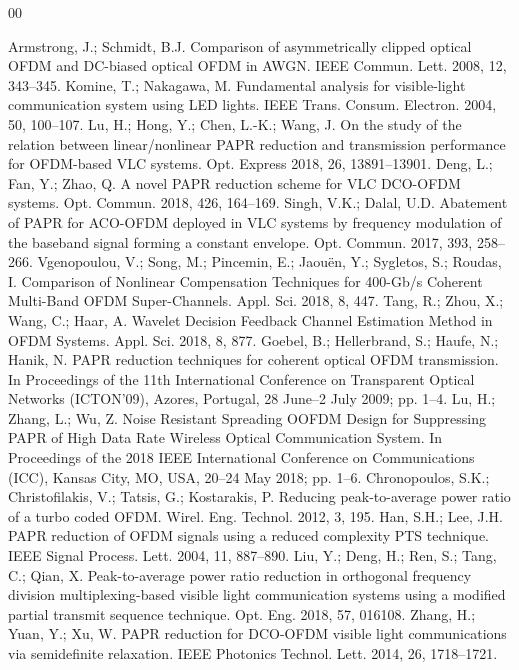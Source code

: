 \documentclass[conference]{IEEEtran}
\begin{document}
\begin{thebibliography}{00}

 Armstrong, J.; Schmidt, B.J. Comparison of asymmetrically clipped optical OFDM and DC-biased optical OFDM in AWGN. IEEE Commun. Lett. 2008, 12, 343--345.
 Komine, T.; Nakagawa, M. Fundamental analysis for visible-light communication system using LED lights. IEEE Trans. Consum. Electron. 2004, 50, 100--107.
 Lu, H.; Hong, Y.; Chen, L.-K.; Wang, J. On the study of the relation between linear/nonlinear PAPR reduction and transmission performance for OFDM-based VLC systems. Opt. Express 2018, 26, 13891--13901.
 Deng, L.; Fan, Y.; Zhao, Q. A novel PAPR reduction scheme for VLC DCO-OFDM systems. Opt. Commun. 2018, 426, 164--169.
 Singh, V.K.; Dalal, U.D. Abatement of PAPR for ACO-OFDM deployed in VLC systems by frequency modulation of the baseband signal forming a constant envelope. Opt. Commun. 2017, 393, 258--266.
 Vgenopoulou, V.; Song, M.; Pincemin, E.; Jaouën, Y.; Sygletos, S.; Roudas, I. Comparison of Nonlinear Compensation Techniques for 400-Gb/s Coherent Multi-Band OFDM Super-Channels. Appl. Sci. 2018, 8, 447.
 Tang, R.; Zhou, X.; Wang, C.; Haar, A. Wavelet Decision Feedback Channel Estimation Method in OFDM Systems. Appl. Sci. 2018, 8, 877.
 Goebel, B.; Hellerbrand, S.; Haufe, N.; Hanik, N. PAPR reduction techniques for coherent optical OFDM transmission. In Proceedings of the 11th International Conference on Transparent Optical Networks (ICTON'09), Azores, Portugal, 28 June--2 July 2009; pp. 1--4.
 Lu, H.; Zhang, L.; Wu, Z. Noise Resistant Spreading OOFDM Design for Suppressing PAPR of High Data Rate Wireless Optical Communication System. In Proceedings of the 2018 IEEE International Conference on Communications (ICC), Kansas City, MO, USA, 20--24 May 2018; pp. 1--6.
 Chronopoulos, S.K.; Christofilakis, V.; Tatsis, G.; Kostarakis, P. Reducing peak-to-average power ratio of a turbo coded OFDM. Wirel. Eng. Technol. 2012, 3, 195.
 Han, S.H.; Lee, J.H. PAPR reduction of OFDM signals using a reduced complexity PTS technique. IEEE Signal Process. Lett. 2004, 11, 887--890.
 Liu, Y.; Deng, H.; Ren, S.; Tang, C.; Qian, X. Peak-to-average power ratio reduction in orthogonal frequency division multiplexing-based visible light communication systems using a modified partial transmit sequence technique. Opt. Eng. 2018, 57, 016108.
 Zhang, H.; Yuan, Y.; Xu, W. PAPR reduction for DCO-OFDM visible light communications via semidefinite relaxation. IEEE Photonics Technol. Lett. 2014, 26, 1718--1721.

\end{thebibliography}
\end{document}
